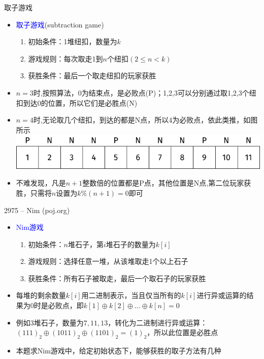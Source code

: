 \begin{frame}{取子游戏}
    \begin{itemize}
        \item \textcolor{blue}{取子游戏}(subtraction game)
        \begin{enumerate}[(1)]
            \item 初始条件：1堆纽扣，数量为$k$
            \item 游戏规则：每次取走1到$n$个纽扣$(2\leq n < k)$
            \item 获胜条件：最后一个取走纽扣的玩家获胜
        \end{enumerate}
        \item $n=3$时,按照算法，0为结束点，是必败点(P)；1,2,3可以分别通过取1,2,3个纽扣到达0的位置，所以它们是必胜点(N)
        \item $n=4$时,无论取几个纽扣，到达的都是N点，所以4为必败点，依此类推，如图所示
        \vfill
        \includegraphics[scale=.9]{fig/7-4.pdf}
        \item 不难发现，凡是$n+1$整数倍的位置都是P点，其他位置是N点,第二位玩家获胜，只需将$n$设置为$k\%(n+1)=0$即可   
    \end{itemize}
\end{frame}
\begin{frame}{2975 -- Nim (poj.org)}
    \begin{itemize}
        \item \textcolor{blue}{Nim游戏}
        \begin{enumerate}[(1)]
            \item 初始条件：$n$堆石子，第$i$堆石子的数量为$k[i]$
            \item 游戏规则：选择任意一堆，从该堆取走1个以上石子
            \item 获胜条件：所有石子被取走，最后一个取石子的玩家获胜
        \end{enumerate}
        \item 每堆的剩余数量$k[i]$用二进制表示，当且仅当所有的$k[i]$进行异或运算的结果为0时是必败点，即$k[1]\oplus k[2]\oplus \ldots \oplus k[n]=0$
        \item 例如3堆石子，数量为$7,11,13$，转化为二进制进行异或运算：$(111)_2\oplus (1011)_2\oplus (1101)_2=(1)_2$，所以此位置是必胜点
        \item 本题求Nim游戏中，给定初始状态下，能够获胜的取子方法有几种   
    \end{itemize}
\end{frame}
